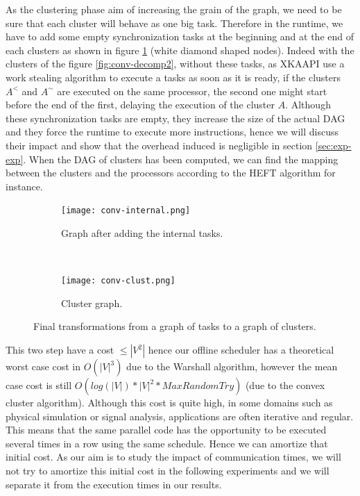 \documentclass[10pt, conference, compsocconf,pdftex,dvipsnames]{IEEEtran}
\begin{document}
As the clustering phase aim of increasing the grain of the graph, we need to
be sure that each cluster will behave as one big task. Therefore in the
runtime, we have to add some empty synchronization tasks at the beginning and
at the end of each clusters as shown in figure \ref{fig:conv-int} (white
diamond shaped nodes). Indeed with the clusters of the figure
\ref{fig:conv-decomp2}, without these tasks,  as XKAAPI use a work stealing
algorithm to execute a tasks as soon as it is ready, if the clusters $A^<$ and
$A^{\sim}$ are executed on the same processor, the second one might start
before the end of the first, delaying the execution of the cluster $A$.
Although these synchronization tasks are empty, they increase the size of the
actual DAG and they force the runtime to execute more instructions, hence we
will discuss their impact and show that the overhead induced is negligible in
section \ref{sec:exp-exp}. When the DAG of
clusters has been computed, we can find the mapping between the clusters and
the processors according to the HEFT algorithm for instance. 

\begin{figure}
    \centering
    \begin{subfigure}{0.24\textwidth}
        \centering
        \texttt{[image: conv-internal.png]}
        \caption{Graph after adding the internal tasks.}
        \label{fig:conv-int}
    \end{subfigure}
    ~
    \begin{subfigure}{0.1\textwidth}
        \centering
        \texttt{[image: conv-clust.png]}
        \caption{Cluster graph.}
        \label{fig:conv-clust}
    \end{subfigure}
    \caption{Final transformations from a graph of tasks to a graph of
    clusters.}
    \label{fig:conv-end}
\end{figure}



This two step have a cost $\leq |V^2|$ hence our offline scheduler has a
theoretical worst case cost in $O(|V|^3)$ due to the Warshall algorithm,
however the mean case cost is still $O(log(|V|)*|V|^2*MaxRandomTry)$ (due to
the convex cluster algorithm).  Although this cost is quite high, in some
domains such as physical simulation or signal analysis, applications are often
iterative and regular. This means that the same parallel code has the
opportunity to be executed several times in a row using the same schedule.
Hence we can amortize that initial cost. As our aim is to study the impact of
communication times, we will not try to amortize this initial cost in the
following experiments and we will separate it from the execution times in our
results.
\end{document}
